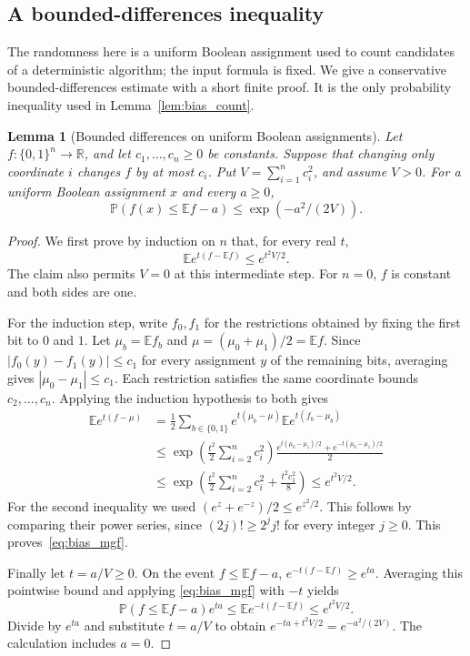 \documentclass[11pt,a4paper]{article}
\newtheorem{lemma}[theorem]{Lemma}
\theoremstyle{definition}
\theoremstyle{remark}
\newcommand{\E}{\mathbb E}
\newcommand{\Prb}{\mathbb P}
\newcommand{\bits}{\{0,1\}}
\begin{document}
\subsection{A bounded-differences inequality}\label{app:bias_concentration}

The randomness here is a uniform Boolean assignment used to count
candidates of a deterministic algorithm; the input formula is fixed.
We give a conservative bounded-differences estimate with a short finite
proof. It is the only probability inequality used in
Lemma~\ref{lem:bias_count}.

\begin{lemma}[Bounded differences on uniform Boolean assignments]
\label{lem:bias_concentration}
Let $f:\bits^n\to\mathbb R$, and let $c_1,\ldots,c_n\ge0$ be constants.
Suppose that changing only coordinate $i$ changes $f$ by at most $c_i$.
Put $V=\sum_{i=1}^n c_i^2$, and assume $V>0$. For a uniform Boolean
assignment $x$ and every $a\ge0$,
\[
 \Prb(f(x)\le\E f-a)\le\exp(-a^2/(2V)).
\]
\end{lemma}
\begin{proof}
We first prove by induction on $n$ that, for every real $t$,
\begin{equation}
 \E e^{t(f-\E f)}\le e^{t^2V/2}.
 \label{eq:bias_mgf}
\end{equation}
The claim also permits $V=0$ at this intermediate step. For $n=0$,
$f$ is constant and both sides are one.

For the induction step, write $f_0,f_1$ for the restrictions obtained by
fixing the first bit to $0$ and $1$. Let $\mu_b=\E f_b$ and
$\mu=(\mu_0+\mu_1)/2=\E f$. Since $|f_0(y)-f_1(y)|\le c_1$ for
every assignment $y$ of the remaining bits, averaging gives
$|\mu_0-\mu_1|\le c_1$. Each restriction satisfies the same coordinate
bounds $c_2,\ldots,c_n$. Applying the induction hypothesis to both gives
\begin{align*}
 \E e^{t(f-\mu)}
 &=\frac12\sum_{b\in\bits}e^{t(\mu_b-\mu)}
                   \E e^{t(f_b-\mu_b)}\\
 &\le\exp\left(\frac{t^2}{2}\sum_{i=2}^n c_i^2\right)
       \frac{e^{t(\mu_0-\mu_1)/2}+e^{-t(\mu_0-\mu_1)/2}}2\\
 &\le\exp\left(\frac{t^2}{2}\sum_{i=2}^n c_i^2+
                       \frac{t^2c_1^2}{8}\right)
 \le e^{t^2V/2}.
\end{align*}
For the second inequality we used
$(e^z+e^{-z})/2\le e^{z^2/2}$. This follows by comparing their power
series, since $(2j)!\ge2^j j!$ for every integer $j\ge0$.
This proves~\eqref{eq:bias_mgf}.

Finally let $t=a/V\ge0$. On the event $f\le\E f-a$,
$e^{-t(f-\E f)}\ge e^{ta}$. Averaging this pointwise bound and applying
\eqref{eq:bias_mgf} with $-t$ yields
\[
 \Prb(f\le\E f-a)e^{ta}
 \le\E e^{-t(f-\E f)}\le e^{t^2V/2}.
\]
Divide by $e^{ta}$ and substitute $t=a/V$ to obtain
$e^{-ta+t^2V/2}=e^{-a^2/(2V)}$. The calculation includes $a=0$.
\end{proof}
\end{document}
